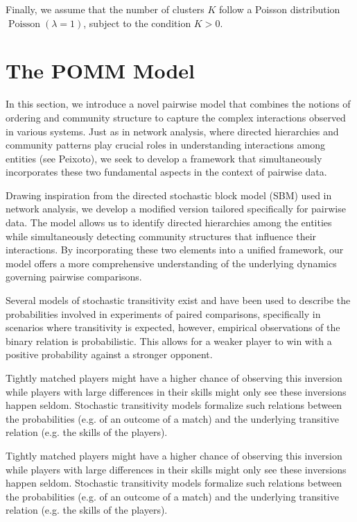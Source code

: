 \documentclass[11pt]{amsart}
\begin{document}
Finally, we assume that the number of clusters $K$ follow a Poisson distribution $\operatorname{Poisson}(\lambda=1)$, subject to the condition $K>0$.


\clearpage

\section{The POMM Model}



In this section, we introduce a novel pairwise model that combines the notions of ordering and community structure to capture the complex interactions observed in various systems. Just as in network analysis, where directed hierarchies and community patterns play crucial roles in understanding interactions among entities (see Peixoto), we seek to develop a framework that simultaneously incorporates these two fundamental aspects in the context of pairwise data.


Drawing inspiration from the directed stochastic block model (SBM) used in network analysis, we develop a modified version tailored specifically for pairwise data. The model allows us to identify directed hierarchies among the entities while simultaneously detecting community structures that influence their interactions. By incorporating these two elements into a unified framework, our model offers a more comprehensive understanding of the underlying dynamics governing pairwise comparisons.

Several models of stochastic transitivity exist and have been used to describe the probabilities involved in experiments of paired comparisons, specifically in scenarios where transitivity is expected, however, empirical observations of the binary relation is probabilistic. This allows for a weaker player to win with a positive probability against a stronger opponent. 

Tightly matched players might have a higher chance of observing this inversion while players with large differences in their skills might only see these inversions happen seldom. Stochastic transitivity models formalize such relations between the probabilities (e.g. of an outcome of a match) and the underlying transitive relation (e.g. the skills of the players).

Tightly matched players might have a higher chance of observing this inversion while players with large differences in their skills might only see these inversions happen seldom. Stochastic transitivity models formalize such relations between the probabilities (e.g. of an outcome of a match) and the underlying transitive relation (e.g. the skills of the players).
\end{document}
